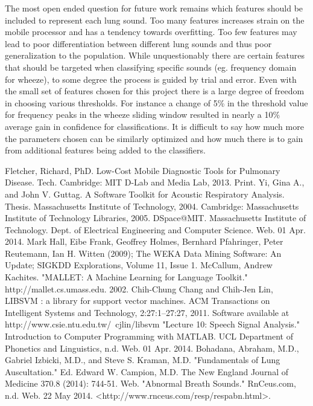 \documentclass{article}
\begin{document}
The most open ended question for future work remains which features should be included to represent each lung sound. Too many features increases strain on the mobile processor and has a tendency towards overfitting. Too few features may lead to poor differentiation between different lung sounds and thus poor generalization to the population. While unquestionably there are certain features that should be targeted when classifying specific sounds (eg. frequency domain for wheeze), to some degree the process is guided by trial and error. Even with the small set of features chosen for this project there is a large degree of freedom in choosing various thresholds. For instance a change of 5\% in the threshold value for frequency peaks in the wheeze sliding window resulted in nearly a 10\% average gain in confidence for classifications. It is difficult to say how much more the parameters chosen can be similarly optimized and how much there is to gain from additional features being added to the classifiers.\\

\newpage

\begin{thebibliography}{9}
	Fletcher, Richard, PhD. Low-Cost Mobile Diagnostic Tools for Pulmonary Disease. Tech. Cambridge: MIT D-Lab and Media Lab, 2013. Print.
	Yi, Gina A., and John V. Guttag. A Software Toolkit for Acoustic Respiratory Analysis. Thesis. Massachusetts Institute of Technology, 2004. Cambridge: Massachusetts Institute of Technology Libraries, 2005. DSpace@MIT. Massachusetts Institute of Technology. Dept. of Electrical Engineering and Computer Science. Web. 01 Apr. 2014.
	Mark Hall, Eibe Frank, Geoffrey Holmes, Bernhard Pfahringer, Peter Reutemann, Ian H. Witten (2009); The WEKA Data Mining Software: An Update; SIGKDD Explorations, Volume 11, Issue 1.
	McCallum, Andrew Kachites.  "MALLET: A Machine Learning for Language Toolkit."
	http://mallet.cs.umass.edu. 2002.
	Chih-Chung Chang and Chih-Jen Lin, LIBSVM : a library for support vector machines. ACM Transactions on Intelligent Systems and Technology, 2:27:1--27:27, 2011. Software available at http://www.csie.ntu.edu.tw/~cjlin/libsvm
	"Lecture 10: Speech Signal Analysis." Introduction to Computer Programming with MATLAB. UCL Department of Phonetics and Linguistics, n.d. Web. 01 Apr. 2014.
	Bohadana, Abraham, M.D., Gabriel Izbicki, M.D., and Steve S. Kraman, M.D. "Fundamentals of Lung Auscultation." Ed. Edward W. Campion, M.D. The New England Journal of Medicine 370.8 (2014): 744-51. Web.
	"Abnormal Breath Sounds." RnCeus.com, n.d. Web. 22 May 2014. <http://www.rnceus.com/resp/respabn.html>.
\end{thebibliography}
\end{document}

